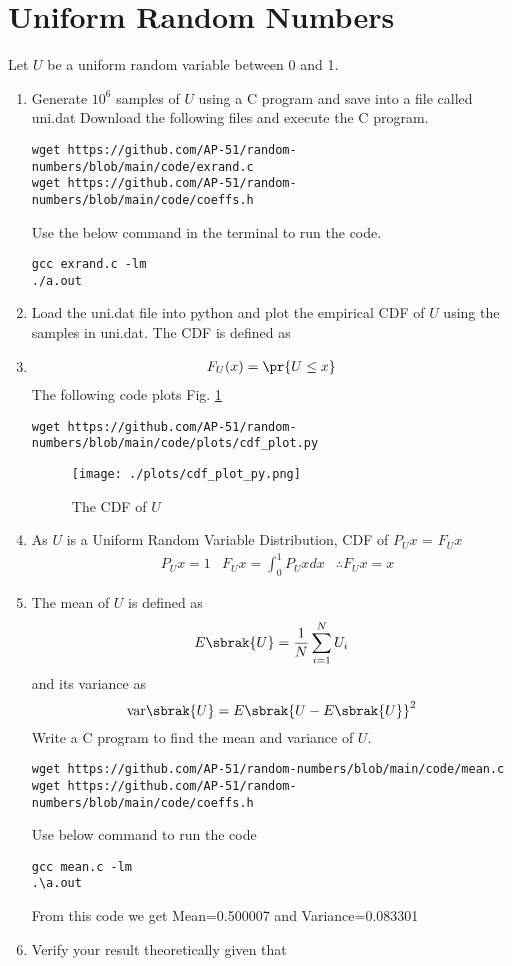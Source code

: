\documentclass[journal,12pt,twocolumn]{IEEEtran}
\renewcommand\thesection{\arabic{section}}
\begin{document}
\section{Uniform Random Numbers}
Let $U$ be a uniform random variable between 0 and 1.
\begin{enumerate}[label=\thesection.\arabic*
,ref=\thesection.\theenumi]
\item Generate $10^6$ samples of $U$ using a C program and save into a file called uni.dat
\solution Download the following files and execute the  C program.
\begin{lstlisting}
wget https://github.com/AP-51/random-numbers/blob/main/code/exrand.c
wget https://github.com/AP-51/random-numbers/blob/main/code/coeffs.h
\end{lstlisting}
Use the below command in the terminal to run the code.
\begin{lstlisting}
gcc exrand.c -lm
./a.out
\end{lstlisting}
\item Load the uni.dat file into python and plot the empirical CDF of $U$ using the samples in uni.dat. The CDF is defined as
\item \begin{align}
    F_{U}(x) = \pr{U \le x}
    \end{align}
\solution  The following code plots Fig. \ref{fig:uni_cdf}
\begin{lstlisting}
wget https://github.com/AP-51/random-numbers/blob/main/code/plots/cdf_plot.py
\end{lstlisting}
\begin{figure}[h]
\centering
\texttt{[image: ./plots/cdf\_plot\_py.png]}
\caption{The CDF of $U$}
\label{fig:uni_cdf}
\end{figure}
%
\item
\solution As $U$ is a Uniform Random Variable Distribution, CDF of $P_{U}{x}$ = $F_{U}{x}$
\begin{align}
    &P_{U}{x}=1
    &F_{U}{x}=\int_{0}^{1}P_{U}{x} dx
    &\therefore F_{U}{x}=x
\end{align}
\item
The mean of $U$ is defined as
%
\begin{equation}
E\sbrak{U} = \frac{1}{N}\sum_{i=1}^{N}U_i
\end{equation}
%
and its variance as
%
\begin{equation}
\text{var}\sbrak{U} = E\sbrak{U- E\sbrak{U}}^2 
\end{equation}
Write a C program to  find the mean and variance of $U$. 
\solution 
\begin{lstlisting}
wget https://github.com/AP-51/random-numbers/blob/main/code/mean.c
wget https://github.com/AP-51/random-numbers/blob/main/code/coeffs.h   
\end{lstlisting}
Use below command to run the code
\begin{lstlisting}
gcc mean.c -lm 
.\a.out   
\end{lstlisting}
From this code we get Mean=0.500007 and Variance=0.083301
\item Verify your result theoretically given that
\end{enumerate}
\end{document}
